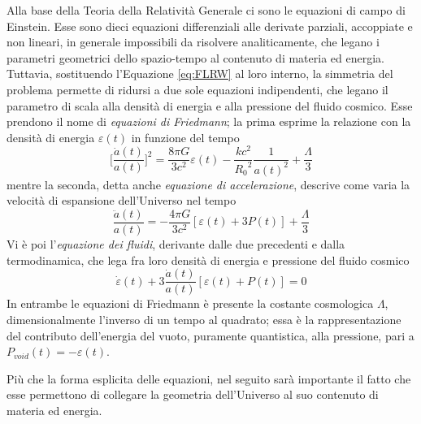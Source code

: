 Alla base della Teoria della Relatività Generale ci sono le equazioni di campo di Einstein. Esse sono dieci equazioni differenziali alle derivate parziali, accoppiate e non lineari, in generale impossibili da risolvere analiticamente, che legano i parametri geometrici dello spazio-tempo al contenuto di materia ed energia. Tuttavia, sostituendo l'Equazione \ref{eq:FLRW} al loro interno, la simmetria del problema permette di ridursi a due sole equazioni indipendenti, che legano il parametro di scala alla densità di energia e alla pressione del fluido cosmico. Esse prendono il nome di \emph{equazioni di Friedmann}; la prima esprime la relazione con la densità di energia $\varepsilon (t)$ in funzione del tempo
\begin{equation}
    \Bigg[\frac{\dot{a}(t)}{a(t)}\Bigg]^2=\frac{8\pi G}{3c^2}\varepsilon (t)-\frac{kc^2}{{R_0}^2}\frac{1}{a(t)^2}+\frac{\Lambda}{3}
    \label{eq:Friedmann1}
\end{equation}
mentre la seconda, detta anche \emph{equazione di accelerazione}, descrive come varia la velocità di espansione dell'Universo nel tempo
\begin{equation}
  \frac{\ddot{a}(t)}{a(t)} = -\frac{4\pi G}{3c^2}[\varepsilon(t)+3P(t)]+\frac{\Lambda}{3}
    \label{eq:Friedmann2}
\end{equation}
Vi è poi l'\emph{equazione dei fluidi}, derivante dalle due precedenti e dalla termodinamica, che lega fra loro densità di energia e pressione del fluido cosmico 
\begin{equation}
\dot{\varepsilon}(t)+3\frac{\dot{a}(t)}{a(t)}[\varepsilon(t) + P(t)]=0
\end{equation}
In entrambe le equazioni di Friedmann è presente la costante cosmologica $\Lambda$, dimensionalmente l'inverso di un tempo al quadrato; essa è la rappresentazione del contributo dell'energia del vuoto, puramente quantistica, alla pressione, pari a $P_{void}(t)=-\varepsilon(t)$.

Più che la forma esplicita delle equazioni, nel seguito sarà importante il fatto che esse permettono di collegare la geometria dell'Universo al suo contenuto di materia ed energia.
